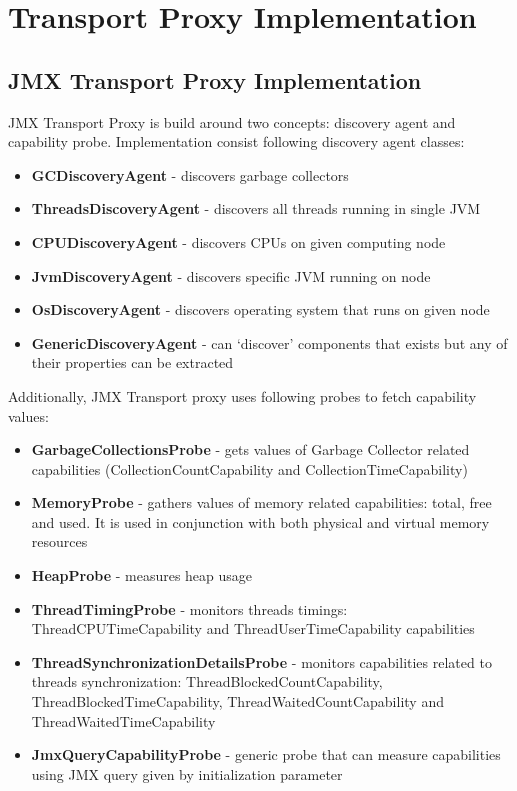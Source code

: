 \section{Transport Proxy Implementation}

\subsection{JMX Transport Proxy Implementation}

JMX Transport Proxy is build around two concepts: discovery agent and capability probe. Implementation consist following discovery agent classes:

\begin{itemize} 
  \item{\bf{GCDiscoveryAgent}} - discovers garbage collectors 
  \item{\bf{ThreadsDiscoveryAgent}} - discovers all threads running in single JVM
  \item{\bf{CPUDiscoveryAgent}} - discovers CPUs on given computing node
  \item{\bf{JvmDiscoveryAgent}} - discovers specific JVM running on node
  \item{\bf{OsDiscoveryAgent}} - discovers operating system that runs on given node
  \item{\bf{GenericDiscoveryAgent}} - can \lq{}discover\rq{} components that exists but any of their properties can be extracted
\end{itemize} 

Additionally, JMX Transport proxy uses following probes to fetch capability values: 

\begin{itemize} 
  \item{\bf{GarbageCollectionsProbe}} - gets values of Garbage Collector related capabilities (CollectionCountCapability and CollectionTimeCapability)
  \item{\bf{MemoryProbe}} - gathers values of memory related capabilities: total, free and used. It is used in conjunction with both physical and virtual memory resources
  \item{\bf{HeapProbe}} - measures heap usage  
  \item{\bf{ThreadTimingProbe}} - monitors threads timings: ThreadCPUTimeCapability and ThreadUserTimeCapability capabilities
  \item{\bf{ThreadSynchronizationDetailsProbe}} - monitors capabilities related to threads synchronization: ThreadBlockedCountCapability, ThreadBlockedTimeCapability, ThreadWaitedCountCapability and ThreadWaitedTimeCapability
  \item{\bf{JmxQueryCapabilityProbe}} - generic probe that can measure capabilities using JMX query given by initialization parameter
\end{itemize} 

